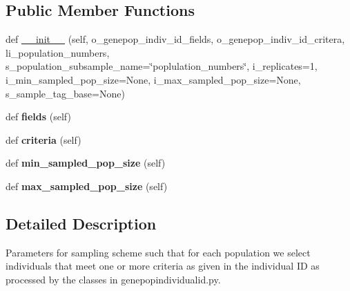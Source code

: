 \subsection*{Public Member Functions}
\begin{DoxyCompactItemize}
\item 
def \hyperlink{classnegui_1_1genepopfilesampler_1_1GenepopFileSampleParamsCriteria_acab5979ca4ef3a3acd0843ebaf672fea}{\+\_\+\+\_\+init\+\_\+\+\_\+} (self, o\+\_\+genepop\+\_\+indiv\+\_\+id\+\_\+fields, o\+\_\+genepop\+\_\+indiv\+\_\+id\+\_\+critera, li\+\_\+population\+\_\+numbers, s\+\_\+population\+\_\+subsample\+\_\+name=\char`\"{}poplulation\+\_\+numbers\char`\"{}, i\+\_\+replicates=1, i\+\_\+min\+\_\+sampled\+\_\+pop\+\_\+size=None, i\+\_\+max\+\_\+sampled\+\_\+pop\+\_\+size=None, s\+\_\+sample\+\_\+tag\+\_\+base=None)
\item 
def {\bfseries fields} (self)\hypertarget{classnegui_1_1genepopfilesampler_1_1GenepopFileSampleParamsCriteria_a3194e915973df1a57ed9f151b5e373e3}{}\label{classnegui_1_1genepopfilesampler_1_1GenepopFileSampleParamsCriteria_a3194e915973df1a57ed9f151b5e373e3}

\item 
def {\bfseries criteria} (self)\hypertarget{classnegui_1_1genepopfilesampler_1_1GenepopFileSampleParamsCriteria_ae7e3713c18e7d30463f918dd8d90816a}{}\label{classnegui_1_1genepopfilesampler_1_1GenepopFileSampleParamsCriteria_ae7e3713c18e7d30463f918dd8d90816a}

\item 
def {\bfseries min\+\_\+sampled\+\_\+pop\+\_\+size} (self)\hypertarget{classnegui_1_1genepopfilesampler_1_1GenepopFileSampleParamsCriteria_a81389d54dc9af80c4aa90720bc9a3935}{}\label{classnegui_1_1genepopfilesampler_1_1GenepopFileSampleParamsCriteria_a81389d54dc9af80c4aa90720bc9a3935}

\item 
def {\bfseries max\+\_\+sampled\+\_\+pop\+\_\+size} (self)\hypertarget{classnegui_1_1genepopfilesampler_1_1GenepopFileSampleParamsCriteria_a8d42466bc9854e633328681f16ec0c04}{}\label{classnegui_1_1genepopfilesampler_1_1GenepopFileSampleParamsCriteria_a8d42466bc9854e633328681f16ec0c04}

\end{DoxyCompactItemize}


\subsection{Detailed Description}
\begin{DoxyVerb}Parameters for sampling scheme such that for each population
we select individuals that meet one or more criteria as 
given in the individual ID as processed by the classes in
genepopindividualid.py. 
\end{DoxyVerb}
 

